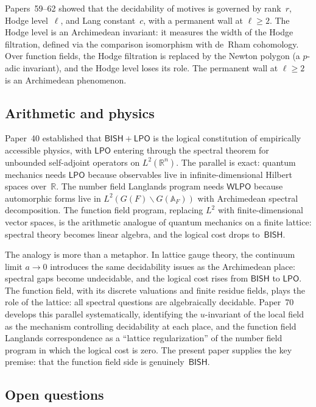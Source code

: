 \documentclass[11pt]{article}
\theoremstyle{plain}
\theoremstyle{definition}
\theoremstyle{remark}
\newcommand{\R}{\mathbb{R}}
\newcommand{\A}{\mathbb{A}}
\newcommand{\BISH}{\mathsf{BISH}}
\newcommand{\LPO}{\mathsf{LPO}}
\newcommand{\WLPO}{\mathsf{WLPO}}
\begin{document}
Papers~59--62 showed that the decidability of motives is governed by rank~$r$,
Hodge level~$\ell$, and Lang constant~$c$, with a permanent wall at
$\ell \ge 2$. The Hodge level is an Archimedean invariant: it measures the
width of the Hodge filtration, defined via the comparison isomorphism with
de~Rham cohomology. Over function fields, the Hodge filtration is replaced by
the Newton polygon (a $p$-adic invariant), and the Hodge level loses its role.
The permanent wall at $\ell \ge 2$ is an Archimedean phenomenon.

\subsection{Arithmetic and physics}

Paper~40 established that $\BISH + \LPO$ is the logical constitution of
empirically accessible physics, with $\LPO$ entering through the spectral
theorem for unbounded self-adjoint operators on $L^2(\R^n)$. The parallel is
exact: quantum mechanics needs $\LPO$ because observables live in
infinite-dimensional Hilbert spaces over~$\R$. The number field Langlands
program needs $\WLPO$ because automorphic forms live in
$L^2(G(F) \backslash G(\A_F))$ with Archimedean spectral decomposition. The
function field program, replacing $L^2$ with finite-dimensional vector spaces,
is the arithmetic analogue of quantum mechanics on a finite lattice: spectral
theory becomes linear algebra, and the logical cost drops to~$\BISH$.

The analogy is more than a metaphor. In lattice gauge theory, the continuum
limit $a \to 0$ introduces the same decidability issues as the Archimedean
place: spectral gaps become undecidable, and the logical cost rises from
$\BISH$ to $\LPO$. The function field, with its discrete valuations and
finite residue fields, plays the role of the lattice: all spectral questions
are algebraically decidable. Paper~70~\cite{Paper70} develops this parallel
systematically, identifying the $u$-invariant of the local field as the
mechanism controlling decidability at each place, and the function field
Langlands correspondence as a ``lattice regularization'' of the number field
program in which the logical cost is zero. The present paper supplies the
key premise: that the function field side is genuinely~$\BISH$.

\subsection{Open questions}
\end{document}
